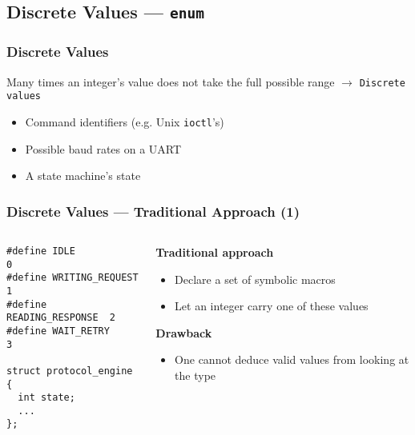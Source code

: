 \subsection{Discrete Values --- \texttt{enum}}


\begin{frame}[fragile]
  \frametitle{Discrete Values}

  Many times an integer's value does not take the full possible range
  $\to$ \texttt{Discrete values}

  \begin{itemize}
  \item Command identifiers (e.g. Unix \texttt{ioctl}'s)
  \item Possible baud rates on a UART
  \item A state machine's state
  \end{itemize}

\end{frame}

\begin{frame}[fragile]
  \frametitle{Discrete Values --- Traditional Approach (1)}

  \begin{columns}[t]

    \begin{column}{.5\textwidth}

      \begin{block}{}
\begin{verbatim}
#define IDLE              0
#define WRITING_REQUEST   1
#define READING_RESPONSE  2
#define WAIT_RETRY        3

struct protocol_engine
{
  int state;
  ...
};
\end{verbatim}
      \end{block}

    \end{column}

    \begin{column}{.4\textwidth}

      \textbf{Traditional approach}

      \begin{itemize}
      \item Declare a set of symbolic macros
      \item Let an integer carry one of these values
      \end{itemize}

      \textbf{Drawback}

      \begin{itemize}
      \item One cannot deduce valid values from looking at the type
      \end{itemize}

    \end{column}
    
  \end{columns}

\end{frame}

